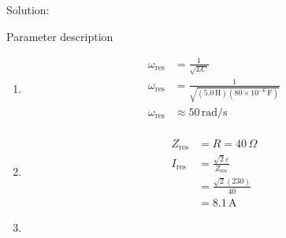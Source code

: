 \documentclass[journal,12pt,twocolumn]{IEEEtran}
\begin{document}
Solution:
\begin{table}[h]
    \centering
    
    \caption{Parameter description}
    \label{tab:my_label}
\end{table}
\begin{enumerate}
\item 
\begin{align}
    \omega_{\text{res}} & = \frac{1}{\sqrt{LC}} \\
    \omega_{\text{res}} & = \frac{1}{\sqrt{(5.0 \, \text{H})(80 \times 10^{-6} \, \text{F})}} \\ 
    \omega_{\text{res}} & \approx 50 \, \text{rad/s} \\
\end{align}

\item 
\begin{align}
    Z_{\text{res}} & = R = 40 \,\Omega\\
    I_{\text{res}} & = \frac{\sqrt{2}\varepsilon}{Z_{\text{res}}} \\
    & = \frac{\sqrt{2}(230)}{40} \\
    & = 8.1 \, \text{A} 
\end{align}



\item 


\end{enumerate}
\end{document}
